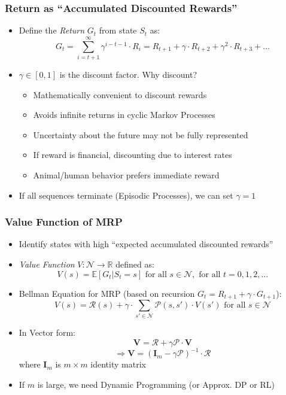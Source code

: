\documentclass[handout]{beamer}
\begin{document}
\begin{frame}
\frametitle{Return as ``Accumulated Discounted Rewards''}
\pause
\begin{itemize}[<+->]
\item Define the {\em Return} $G_t$ from state $S_t$ as:
$$G_t = \sum_{i=t+1}^{\infty} \gamma^{i-t-1} \cdot R_i = R_{t+1} + \gamma \cdot R_{t+2} + \gamma^2 \cdot R_{t+3} + \ldots$$
\item $\gamma \in [0, 1]$ is the discount factor. Why discount?
\begin{itemize}
\item Mathematically convenient to discount rewards
\item Avoids infinite returns in cyclic Markov Processes
\item Uncertainty about the future may not be fully represented
\item If reward is financial, discounting due to interest rates
\item Animal/human behavior prefers immediate reward
\end{itemize}
\item If all sequences terminate (Episodic Processes), we can set $\gamma = 1$
\end{itemize}
\end{frame}

\begin{frame}
\frametitle{Value Function of MRP}
\pause
\begin{itemize}[<+->]
\item Identify states with high ``expected accumulated discounted rewards''
\item {\em Value Function} $V: \mathcal{N} \rightarrow \mathbb{R}$ defined as:
$$V(s) = \mathbb{E}[G_t|S_t=s] \text{ for all } s \in \mathcal{N}, \text{ for all } t = 0, 1, 2, \ldots$$
\item Bellman Equation for MRP (based on recursion $G_t = R_{t+1} + \gamma \cdot G_{t+1}$):
$$V(s) = \mathcal{R}(s) + \gamma \cdot \sum_{s' \in \mathcal{N}} \mathcal{P}(s, s') \cdot V(s') \text{ for all } s \in \mathcal{N}$$
\item In Vector form:
$$\bm{V} = \bm{\mathcal{R}} + \gamma \bm{\mathcal{P}} \cdot \bm{V}$$
$$\Rightarrow \bm{V} = (\bm{I}_m - \gamma \bm{\mathcal{P}})^{-1} \cdot \bm{\mathcal{R}}$$
where $\bm{I}_m$ is $m \times m$ identity matrix
\item If $m$ is large, we need Dynamic Programming (or Approx. DP or RL)
\end{itemize}
\end{frame}
\end{document}
